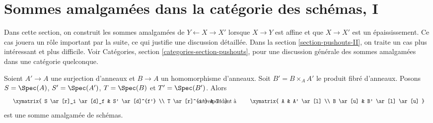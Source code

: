 \section{Sommes amalgamées dans la catégorie des schémas, I}
\label{section-pushouts}

\noindent
Dans cette section, on construit les sommes amalgamées de $Y \leftarrow X \rightarrow X'$
lorsque $X \to Y$ est affine et que $X \to X'$ est un épaississement. Ce cas
jouera un rôle important par la suite, ce qui justifie une discussion détaillée.
Dans la section \ref{section-pushouts-II}, on traite un cas plus intéressant
et plus difficile. Voir Catégories, section
\ref{categories-section-pushouts}, pour une discussion générale
des sommes amalgamées dans une catégorie quelconque.

\begin{lemma}
\label{lemma-basic-example-pushout}
Soient $A' \to A$ une surjection d'anneaux et $B \to A$ un homomorphisme d'anneaux.
Soit $B' = B \times_A A'$ le produit fibré d'anneaux. Posons
$S = \Spec(A)$, $S' = \Spec(A')$, $T = \Spec(B)$ et $T' = \Spec(B')$.
Alors
$$
\vcenter{
\xymatrix{
S \ar[r]_i \ar[d]_f & S' \ar[d]^{f'} \\
T \ar[r]^{i'} & T'
}
}
\quad\text{correspondant à}\quad
\vcenter{
\xymatrix{
A & A' \ar[l] \\
B \ar[u] & B' \ar[l] \ar[u]
}
}
$$
est une somme amalgamée de schémas.
\end{lemma}

